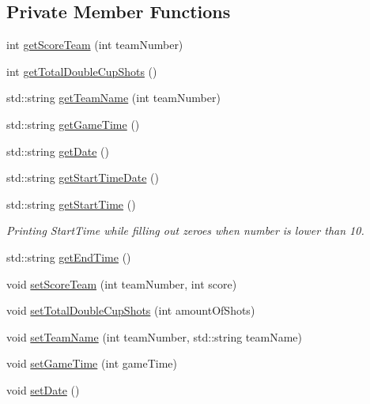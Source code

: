 \subsection*{Private Member Functions}
\begin{DoxyCompactItemize}
\item 
int \hyperlink{class_website_score_handling_acf28b6af9500124725c1ed6fb685fe5e}{get\+Score\+Team} (int team\+Number)
\item 
int \hyperlink{class_website_score_handling_a16769000b8ae94f3fffd1480fc544ec8}{get\+Total\+Double\+Cup\+Shots} ()
\item 
std\+::string \hyperlink{class_website_score_handling_a49314d4db6208788e53a9d56fa99dfee}{get\+Team\+Name} (int team\+Number)
\item 
std\+::string \hyperlink{class_website_score_handling_acc2365bbbfccb16022e568e93ec7ecc5}{get\+Game\+Time} ()
\item 
std\+::string \hyperlink{class_website_score_handling_adf5d617f2dfe1eb846eb3e008348f685}{get\+Date} ()
\item 
std\+::string \hyperlink{class_website_score_handling_a6d3947bb69c2095f2323dbfa2afb7e6c}{get\+Start\+Time\+Date} ()
\item 
std\+::string \hyperlink{class_website_score_handling_ae35c87db5467a9d52e08cb5c0600fcf6}{get\+Start\+Time} ()
\begin{DoxyCompactList}\small\item\em Printing Start\+Time while filling out zeroes when number is lower than 10. \end{DoxyCompactList}\item 
std\+::string \hyperlink{class_website_score_handling_a06e4bba446c2b438fc2bfc52b2a6176e}{get\+End\+Time} ()
\item 
void \hyperlink{class_website_score_handling_ab4153d78bc79616303c5d338999d4b77}{set\+Score\+Team} (int team\+Number, int score)
\item 
void \hyperlink{class_website_score_handling_a2705a6902f38cd6663de44e43ad00eaa}{set\+Total\+Double\+Cup\+Shots} (int amount\+Of\+Shots)
\item 
void \hyperlink{class_website_score_handling_a5b3bc3e78e0f65ef4749124d7f57c42f}{set\+Team\+Name} (int team\+Number, std\+::string team\+Name)
\item 
void \hyperlink{class_website_score_handling_a08c2b9801c68f88da1e93f4cabeecc22}{set\+Game\+Time} (int game\+Time)
\item 
void \hyperlink{class_website_score_handling_a6bb8369b8bbffc82bdaa290bb716ad5c}{set\+Date} ()

\end{DoxyCompactItemize}
